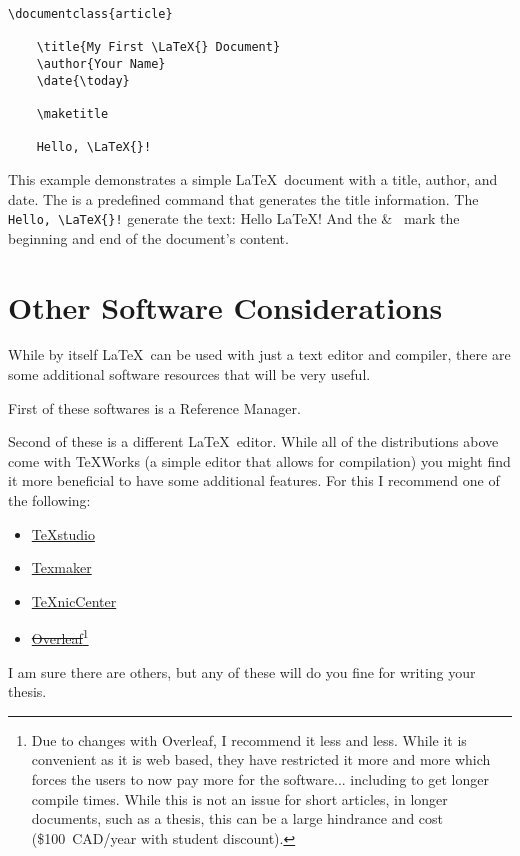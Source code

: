 		\begin{lstlisting}[style=LaTeXStyle]
\documentclass{article}

    \title{My First \LaTeX{} Document}
    \author{Your Name}
    \date{\today}
    
    \maketitle
    
    Hello, \LaTeX{}!

		\end{lstlisting}
		This example demonstrates a simple \LaTeX\ document with a title, author, and date. 
		The  is a predefined command that generates the title information.
		The \lstinline|Hello, \LaTeX{}!| generate the text: Hello \LaTeX!
		And the  \&\  mark the beginning and end of the document's content.

	\section{Other Software Considerations}
		While by itself \LaTeX\ can be used with just a text editor and compiler, there are some additional software resources that will be very useful.
		
		First of these softwares is a Reference Manager.
		
		
		Second of these is a different \LaTeX\ editor.
		While all of the distributions above come with TeXWorks (a simple editor that allows for compilation) you might find it more beneficial to have some additional features.
		For this I recommend one of the following:
		\begin{itemize}
			\item \href{https://www.texstudio.org/}{TeXstudio}
			\item \href{http://www.xm1math.net/texmaker/}{Texmaker}
			\item \href{http://www.texniccenter.org/}{TeXnicCenter}
			\item \href{https://www.overleaf.com/}{\sout{Overleaf}}\footnote{Due to changes with Overleaf, I recommend it less and less. While it is convenient as it is web based, they have restricted it more and more which forces the users to now pay more for the software... including to get longer compile times. While this is not an issue for short articles, in longer documents, such as a thesis, this can be a large hindrance and cost (\$100~CAD/year with student discount).}
		\end{itemize}
		I am sure there are others, but any of these will do you fine for writing your thesis.